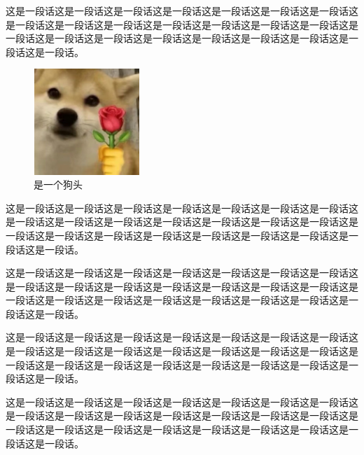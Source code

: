 \documentclass[normalsize]{article}   %
\begin{document}
		\newpage
			这是一段话这是一段话这是一段话这是一段话这是一段话这是一段话这是一段话这是一段话这是一段话这是一段话这是一段话这是一段话这是一段话这是一段话这是一段话这是一段话这是一段话这是一段话这是一段话这是一段话这是一段话这是一段话这是一段话。
			\begin{figure}[b]
			\centering
			\includegraphics[height=4cm,width=4cm]{./img/sample.png}
			\caption{是一个狗头}
			\label{fig:10}
		\end{figure}
	这是一段话这是一段话这是一段话这是一段话这是一段话这是一段话这是一段话这是一段话这是一段话这是一段话这是一段话这是一段话这是一段话这是一段话这是一段话这是一段话这是一段话这是一段话这是一段话这是一段话这是一段话这是一段话这是一段话。
	
	
		这是一段话这是一段话这是一段话这是一段话这是一段话这是一段话这是一段话这是一段话这是一段话这是一段话这是一段话这是一段话这是一段话这是一段话这是一段话这是一段话这是一段话这是一段话这是一段话这是一段话这是一段话这是一段话这是一段话。
		
		
		
			这是一段话这是一段话这是一段话这是一段话这是一段话这是一段话这是一段话这是一段话这是一段话这是一段话这是一段话这是一段话这是一段话这是一段话这是一段话这是一段话这是一段话这是一段话这是一段话这是一段话这是一段话这是一段话这是一段话。
			
			
				这是一段话这是一段话这是一段话这是一段话这是一段话这是一段话这是一段话这是一段话这是一段话这是一段话这是一段话这是一段话这是一段话这是一段话这是一段话这是一段话这是一段话这是一段话这是一段话这是一段话这是一段话这是一段话这是一段话。
	
\end{document}
